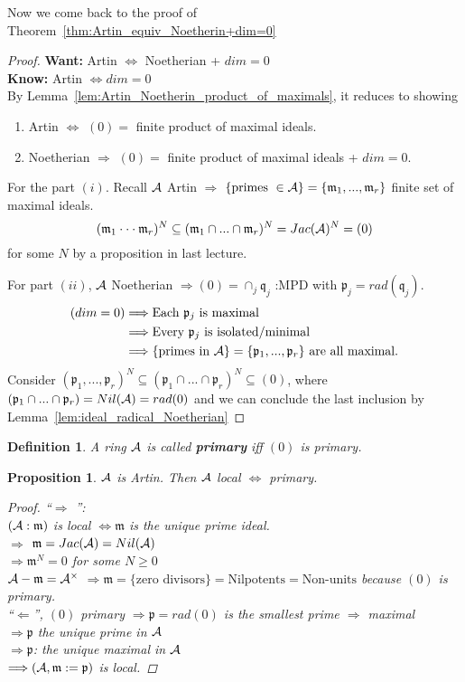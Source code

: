 \documentclass[11pt]{article}
\newtheorem{prop}[thm]{Proposition}
\newtheorem{dfn}[thm]{Definition}
\newcommand{\scm}{{\mathfrak m}}
\newcommand{\scp}{{\mathfrak p}}
\newcommand{\scq}{\mathfrak q}
\newcommand{\cala}{{\cal A}}
\newcommand{\Lrta}{\Longrightarrow}
\newcommand{\Llta}{\Longleftarrow}
\newcommand{\Llrta}{\Longleftrightarrow}
\begin{document}
Now we come back to the proof of Theorem~\ref{thm:Artin_equiv_Noetherin+dim=0}
\begin{proof}
\textbf{Want:} Artin $\Llrta $ Noetherian + $dim=0$\\
\textbf{Know:} Artin $\Llrta dim=0$\\
By Lemma~\ref{lem:Artin_Noetherin_product_of_maximals}, it reduces to showing 
\begin{enumerate}[label=(\roman*)]
\item Artin $\Llrta $ $(0)=$ finite product of maximal ideals.
\item Noetherian $\Lrta $ $(0)=$ finite product of maximal ideals + $dim=0$.
\end{enumerate}

For the part $(i)$. Recall $\cala$ Artin $\Lrta $ $\{\text{primes }\in \cala\}=\{\scm_1,...,\scm_r\}$ finite set of maximal ideals.
$$
(\scm_1\cdot \cdot \cdot \scm_r)^N\subseteq (\scm_1\cap ...\cap \scm_r)^N=Jac(\cala)^N=(0)
$$
for some $N$ by a proposition in last lecture.

For part $(ii)$, $\cala$ Noetherian $\Lrta (0)=\cap_j\scq_j$ :MPD with $\scp_j=rad(\scq_j)$.
$$
\begin{aligned}
(dim=0)& \Lrta\text{Each $\scp_j$ is maximal}\\
& \Lrta \text{Every $\scp_j$ is isolated/minimal}\\
& \Lrta \text{\{primes in $\cala$\}}=\{\scp_1,...,\scp_r\} \text{ are all maximal.}
\end{aligned}
$$
Consider $(\scp_1,...,\scp_r)^N\subseteq (\scp_1\cap...\cap\scp_r)^N\subseteq (0)$, where $(\scp_1\cap...\cap \scp_r)=Nil(\cala)=rad(0)$ and we can conclude the last inclusion by Lemma~\ref{lem:ideal_radical_Noetherian}
\end{proof}
\begin{dfn}
A ring $\cala$ is called \textbf{primary} iff $(0)$ is primary.
\end{dfn}

\begin{prop}
$\cala$ is Artin. Then $\cala$ local $\Llrta $ primary.
\begin{proof}
``$\Lrta$ '':\\
$(\cala:\scm)$ is local $\Llrta \scm $ is the unique prime ideal.\\
$\Lrta$ $\scm=Jac(\cala)=Nil(\cala)$\\
$\Lrta\scm^N=0$ for some $N\geq 0$\\
$\cala-\scm=\cala^\times$
$\Lrta\scm=\{\text{zero divisors}\}=\text{Nilpotents}=\text{Non-units}$ because $(0)$ is primary.\\
``$\Llta$'', $(0)$ primary $\Lrta \scp=rad(0)$ is the smallest prime $\Lrta$ maximal\\
$\Lrta\scp$ the unique prime in $\cala$\\
$\Lrta\scp$: the unique maximal in $\cala$\\
$\Lrta(\cala,\scm:=\scp)$ is local.

\end{proof}
\end{prop}
\end{document}
